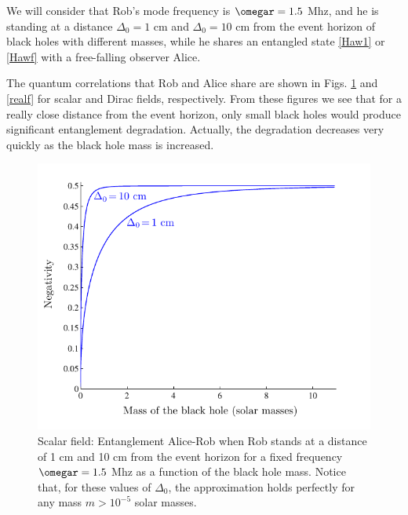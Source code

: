 We will consider that Rob's mode frequency is $\omegar=1.5$ Mhz, and
he is standing at a distance $\Delta_0=1$ cm and $\Delta_0=10$ cm
from the event horizon of  black holes with different masses, while he
shares an entangled state
\eqref{Haw1} or \eqref{Hawf} with a free-falling observer Alice.

The quantum correlations that Rob and Alice share are shown in Figs.
\ref{realb} and \ref{realf} for scalar and Dirac fields, respectively.
From these figures we see that for a really close distance from the event
horizon, only small black holes would produce significant entanglement
degradation. Actually, the degradation decreases very quickly as the
black hole mass is increased.




\begin{figure}[h]
\begin{center}
\includegraphics[width=.85\textwidth]{1cm1Mhz}
\caption{Scalar field: Entanglement Alice-Rob when Rob stands at a distance
of 1 cm and 10 cm from the event horizon for a fixed frequency
$\omegar=1.5$ Mhz as a function of the black hole mass. Notice that,
for these values of $\Delta_0$, the approximation holds perfectly for any mass $m>10^{-5}$ solar masses.}
\label{realb}
\end{center}
\end{figure}


